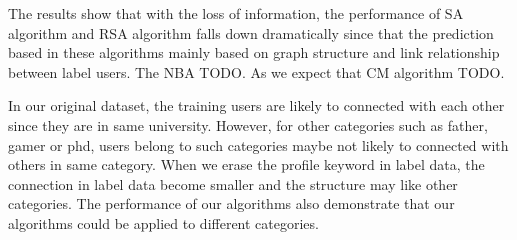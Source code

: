 \documentclass{article}
\begin{document}
The results show that with the loss of information, the performance of SA algorithm and RSA algorithm falls down dramatically since that the prediction based in these algorithms mainly based on graph structure and link relationship between label users. The NBA TODO. As we expect that CM algorithm TODO.

In our original dataset, the training users are likely to connected with each other since they are in same university. However, for other categories such as father, gamer or phd, users belong to such categories maybe not likely to connected with others in same category. When we erase the profile keyword in label data, the connection in label data become smaller and the structure may like other categories. The performance of our algorithms also demonstrate that our algorithms could be applied to different categories.

\ifx \allfiles \undefined
\end{document}
